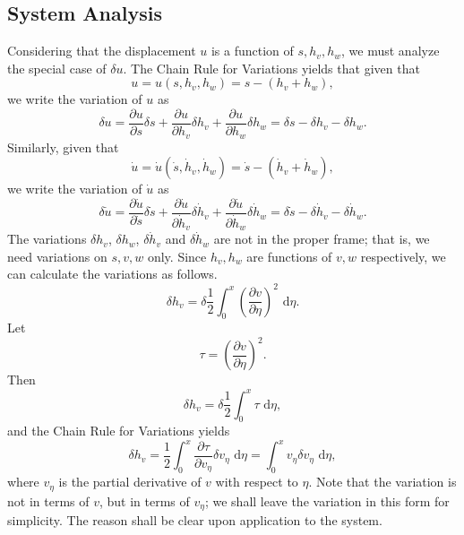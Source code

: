 \subsection{System Analysis}
Considering that the displacement $u$ is a function of $s,h_v,h_w$, we must analyze the special case of $\delta u$. The Chain Rule for Variations yields that given that
\begin{equation}
u = u(s,h_v,h_w) = s-(h_v+h_w),
\end{equation}
we write the variation of $u$ as
\begin{equation}
\delta u = \frac{\partial u}{\partial s}\delta s+\frac{\partial u}{\partial h_v}\delta h_v+\frac{\partial u}{\partial h_w}\delta h_w = \delta s - \delta h_v - \delta h_w.
\label{eq:variation.u}
\end{equation}
Similarly, given that
\begin{equation}
\dot{u} = \dot{u}(\dot s,\dot h_v, \dot h_w) = \dot s - (\dot h_v+\dot h_w),
\end{equation}
we write the variation of $\dot u$ as
\begin{equation}
\delta \dot u = \frac{\partial \dot u}{\partial \dot s}\delta \dot s+\frac{\partial \dot u}{\partial \dot h_v}\delta \dot h_v+\frac{\partial \dot u}{\partial \dot h_w}\delta \dot h_w = \delta \dot s - \delta \dot h_v - \delta \dot h_w.
\end{equation}
The variations $\delta h_v$, $\delta h_w$, $\delta \dot h_v$ and $\delta \dot h_w$ are not in the proper frame; that is, we need variations on $s,v,w$ only. Since $h_v,h_w$ are functions of $v,w$ respectively, we can calculate the variations as follows.
\begin{equation}
\delta h_v = \delta \frac{1}{2} \int_0^x\left(\frac{\partial v}{\partial \eta}\right)^2\text{ d}\eta.
\end{equation}
Let 
\begin{equation}
\tau = \left(\frac{\partial v}{\partial \eta}\right)^2.
\end{equation}
Then
\begin{equation}
\delta h_v = \delta \frac{1}{2} \int_0^x \tau \text{ d}\eta,
\end{equation}
and the Chain Rule for Variations yields
\begin{equation}
\delta h_v = \frac{1}{2}\int_0^x \frac{\partial \tau}{\partial v_{\eta}}\delta v_{\eta}\text{ d}\eta = \int_0^xv_{\eta}\delta v_{\eta}\text{ d}\eta,
\end{equation}
where $v_{\eta}$ is the partial derivative of $v$ with respect to $\eta$. Note that the variation is not in terms of $v$, but in terms of $v_{\eta}$; we shall leave the variation in this form for simplicity. The reason shall be clear upon application to the system.

